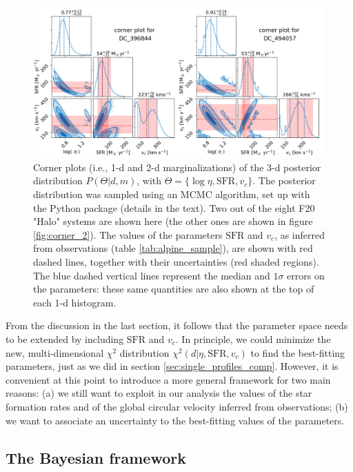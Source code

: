 \begin{figure}
    \centering
    \includegraphics[width=1.0\textwidth]{plots/corner_final_1.png}
    \caption{Corner plots (i.e., 1-d and 2-d marginalizations) of the 3-d posterior distribution $P(\Theta|d,m)$, with $\Theta = \{\log\eta, \mathrm{SFR}, v_c\}$. The posterior distribution was sampled using an MCMC algorithm, set up with the Python package  (details in the text). Two out of the eight F20 "\CII Halo" systems are shown here (the other ones are shown in figure \ref{fig:corner_2}). The values of the parameters $\mathrm{SFR}$ and $v_c$, as inferred from observations (table \ref{tab:alpine_sample}), are shown with red dashed lines, together with their uncertainties (red shaded regions). The blue dashed vertical lines represent the median and $1\sigma$ errors on the parameters: these same quantities are also shown at the top of each 1-d histogram. 
    \label{fig:corner_1}
    }
\end{figure}

From the discussion in the last section, it follows that the parameter space needs to be extended by including $\mathrm{SFR}$ and $v_c$. In principle, we could minimize the new, multi-dimensional $\chi^2$ distribution $\chi^2(d|\eta, \mathrm{SFR}, v_c)$ to find the best-fitting parameters, just as we did in section \ref{sec:single_profiles_comp}.
%
However, it is convenient at this point to introduce a more general framework for two main reasons: (a) we still want to exploit in our analysis the values of the star formation rates and of the global circular velocity inferred from observations; (b) we want to associate an uncertainty to the best-fitting values of the parameters.

\subsection{The Bayesian framework} \label{sec:bayes}

